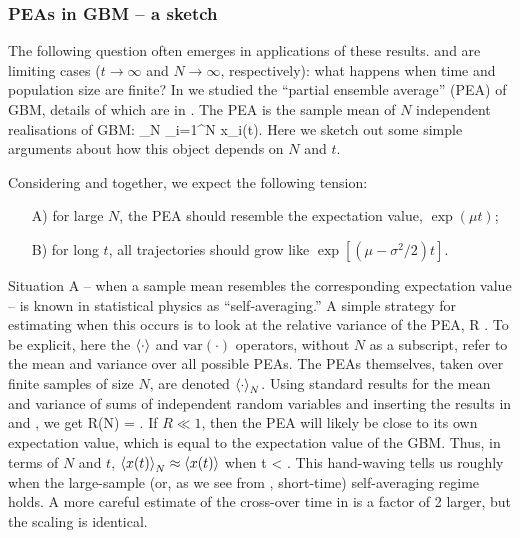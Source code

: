\subsubsection{PEAs in GBM -- a sketch}
The following question often emerges in applications of these results.  and  are limiting cases ($t \to \infty$ and $N\to\infty$, respectively): what happens when time and population size are finite? In \cite{PetersKlein2013} we studied the ``partial ensemble average'' (PEA) of GBM, details of which are in . The PEA is the sample mean of $N$ independent realisations of GBM:
\be
{}_N \equiv {} \sum_{i=1}^N x_i(t).
\ee
Here we sketch out some simple arguments about how this object depends on $N$ and $t$.

Considering  and  together, we expect the following tension:
\begin{enumerate}
\item[A)] for large $N$, the PEA should resemble the expectation value, $\exp(\mu t)$;
\item[B)] for long $t$, all trajectories should grow like $\exp[(\mu-\sigma^2/2)t]$.
\end{enumerate}
Situation A -- when a sample mean resembles the corresponding expectation value -- is known in statistical physics as ``self-averaging.'' A simple strategy for estimating when this occurs is to look at the relative variance of the PEA,
\be
R \equiv {}.
\ee
To be explicit, here the $\left\langle\cdot \right\rangle$ and $\text{var}(\cdot)$ operators, 
without $N$ as a subscript, 
refer to the mean and variance over all possible PEAs. The PEAs themselves, taken over finite samples of size $N$, are denoted $\left\langle\cdot \right\rangle_N$. 
Using standard results for the mean and variance of sums of independent random variables and inserting the results in  and , we get
\be
R(N) = .
\ee
If $R \ll 1$, then the PEA will likely be close to its own expectation value, which is equal to the expectation value of the GBM. Thus, in terms of $N$ and $t$, $\left\langle x(t) \right\rangle_N\approx\left\langle x(t) \right\rangle$ when
\be
t < .
\ee
This hand-waving tells us roughly when the large-sample (or, as we see from , short-time) self-averaging regime holds. A more careful estimate of the cross-over time in  is a factor of 2 larger, but the scaling is identical.

